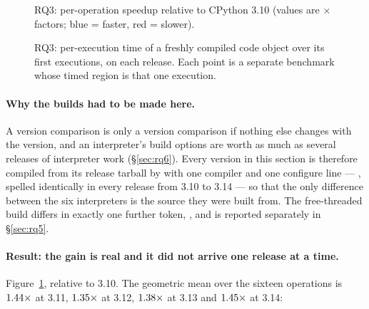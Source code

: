 \begin{figure}[t]
  \centering
  \caption{RQ3: per-operation speedup relative to CPython 3.10 (values are $\times$
    factors; blue = faster, red = slower).}
  \label{fig:versions}
\end{figure}

\begin{table}[t]
  \centering
  \caption{RQ3: structural runtime properties measured by the same suite.}
  \label{tab:facts}
  \small
  
\end{table}

\begin{figure}[t]
  \centering
  \caption{RQ3: per-execution time of a freshly compiled code object over its first
    executions, on each release. Each point is a separate  benchmark whose timed
    region is that one execution.}
  \label{fig:warmup}
\end{figure}

\paragraph{Why the builds had to be made here.} A version comparison is only a version
comparison if nothing else changes with the version, and an interpreter's build options are
worth as much as several releases of interpreter work (\S\ref{sec:rq6}). Every version in this
section is therefore compiled from its release tarball by  with
one compiler and one configure line --- , spelled identically in
every release from 3.10 to 3.14 --- so that the only difference between the six interpreters is
the source they were built from. The free-threaded build differs in exactly one further token,
, and is reported separately in \S\ref{sec:rq5}.

\paragraph{Result: the gain is real and it did not arrive one release at a time.}
Figure~\ref{fig:versions}, relative to 3.10. The geometric mean over the
sixteen operations is $\meas{geomean:b3_runtime-v310|b3_runtime-v311}{1.44}\times$ at 3.11, $\meas{geomean:b3_runtime-v310|b3_runtime-v312}{1.35}\times$ at 3.12, $\meas{geomean:b3_runtime-v310|b3_runtime-v313}{1.38}\times$ at 3.13 and
$\meas{geomean:b3_runtime-v310|b3_runtime-v314}{1.45}\times$ at 3.14:

